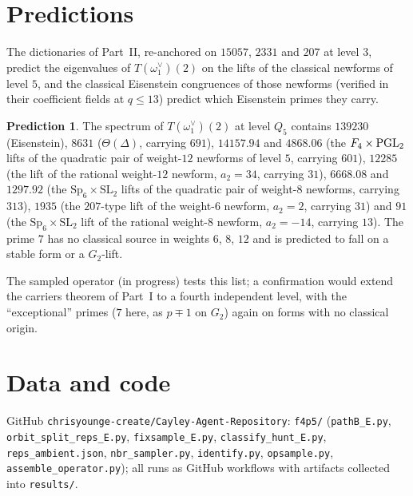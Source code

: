 \documentclass[11pt]{article}
\theoremstyle{definition}\newtheorem{computation}[theorem]{Computation}\newtheorem{remark}[theorem]{Remark}\newtheorem{prediction}[theorem]{Prediction}
\begin{document}
\section{Predictions}
The dictionaries of Part~II, re-anchored on $15057$, $2331$ and $207$ at level $3$, predict the eigenvalues of $T(\omega_1^\vee)(2)$ on the lifts of the classical newforms of level $5$, and the classical Eisenstein congruences of those newforms (verified in their coefficient fields at $q\le13$) predict which Eisenstein primes they carry.
\begin{prediction}\label{pred}
The spectrum of $T(\omega_1^\vee)(2)$ at level $Q_5$ contains $139230$ (Eisenstein), $8631$ ($\Theta(\Delta)$, carrying $691$), $14157.94$ and $4868.06$ (the $F_4\times\mathrm{PGL}_2$ lifts of the quadratic pair of weight-$12$ newforms of level $5$, carrying $601$), $12285$ (the lift of the rational weight-$12$ newform, $a_2=34$, carrying $31$), $6668.08$ and $1297.92$ (the $\mathrm{Sp}_6\times\mathrm{SL}_2$ lifts of the quadratic pair of weight-$8$ newforms, carrying $313$), $1935$ (the $207$-type lift of the weight-$6$ newform, $a_2=2$, carrying $31$) and $91$ (the $\mathrm{Sp}_6\times\mathrm{SL}_2$ lift of the rational weight-$8$ newform, $a_2=-14$, carrying $13$). The prime $7$ has no classical source in weights $6$, $8$, $12$ and is predicted to fall on a stable form or a $G_2$-lift.
\end{prediction}
The sampled operator (in progress) tests this list; a confirmation would extend the carriers theorem of Part~I to a fourth independent level, with the ``exceptional'' primes ($7$ here, as $p\mp1$ on $G_2$) again on forms with no classical origin.

\section*{Data and code}
GitHub \texttt{chrisyounge-create/Cayley-Agent-Repository}: \texttt{f4p5/} (\texttt{pathB\_E.py}, \texttt{orbit\_split\_reps\_E.py}, \texttt{fixsample\_E.py}, \texttt{classify\_hunt\_E.py}, \texttt{reps\_ambient.json}, \texttt{nbr\_sampler.py}, \texttt{identify.py}, \texttt{opsample.py}, \texttt{assemble\_operator.py}); all runs as GitHub workflows with artifacts collected into \texttt{results/}.
\end{document}
